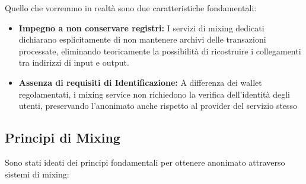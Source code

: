 Quello che vorremmo in realtà sono due caratteristiche fondamentali:
\begin{itemize}
    \item \textbf{Impegno a non conservare registri:} I servizi di mixing dedicati dichiarano esplicitamente di non mantenere archivi delle transazioni processate, eliminando teoricamente la possibilità di ricostruire i collegamenti tra indirizzi di input e output.
    \item \textbf{Assenza di requisiti di Identificazione: } A differenza dei wallet regolamentati, i mixing service non richiedono la verifica dell’identità degli utenti, preservando l’anonimato anche rispetto al provider del servizio stesso
\end{itemize}

\subsection{Principi di Mixing}
Sono stati ideati dei principi fondamentali per ottenere anonimato attraverso sistemi di mixing:
